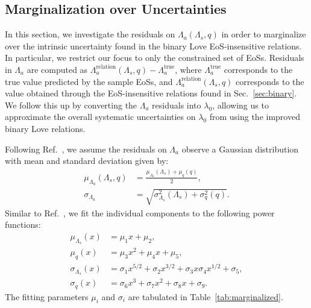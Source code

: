 \documentclass[prd,twocolumn,nofootinbib,superscriptaddress,amsmath,amssymb]{revtex4-1}
\begin{document}
\subsection{Marginalization over Uncertainties}\label{sec:marginalization}

In this section, we investigate the residuals on $\Lambda_a(\Lambda_s,q)$ in order to marginalize over the intrinsic uncertainty found in the binary Love EoS-insensitive relations.
In particular, we restrict our focus to only the constrained set of EoSs.
Residuals in $\Lambda_a$ are computed as $\Lambda_a^{\text{relation}}(\Lambda_s,q)-\Lambda_a^{\text{true}}$, where $\Lambda_a^{\text{true}}$ corresponds to the true value predicted by the sample EoSs, and $\Lambda_a^{\text{relation}}(\Lambda_s,q)$ corresponds to the value obtained through the EoS-insensitive relations found in Sec.~\ref{sec:binary}.
We follow this up by converting the $\Lambda_a$ residuals into $\lambda_0$, allowing us to approximate the overall systematic uncertainties on $\lambda_0$ from using the improved binary Love relations.

Following Ref.~\cite{Katerina:residuals}, we assume the residuals on $\Lambda_a$ observe a Gaussian distribution with mean and standard deviation given by:
\begin{align}
\mu_{\Lambda_a}(\Lambda_s,q) &=\frac{\mu_{\Lambda_s}(\Lambda_s)+\mu_{q}(q)}{2},\\ 
\sigma_{\Lambda_a} &=\sqrt{\sigma_{\Lambda_s}^2(\Lambda_s) + \sigma_{q}^2(q)}. 
\end{align}
Similar to Ref.~\cite{Katerina:residuals}, we fit the individual components to the following power functions:
\begin{align}
\mu_{\Lambda_s}(x) &= \mu_1 x + \mu_2, \label{eq:margFit1}\\ 
\mu_{q}(x) &= \mu_3 x^2 + \mu_4 x + \mu_5, \label{eq:margFit2}\\ 
\sigma_{\Lambda_s}(x) &= \sigma_1 x^{5/2} + \sigma_2 x^{3/2} + \sigma_3 x \sigma_4 x^{1/2} + \sigma_5, \label{eq:margFit3}\\ 
\sigma_{q}(x) &= \sigma_6 x^3 + \sigma_7 x^2 + \sigma_8 x + \sigma_9. \label{eq:margFit4}
\end{align}
The fitting parameters $\mu_i$ and $\sigma_i$ are tabulated in Table~\ref{tab:marginalized}.
\end{document}

